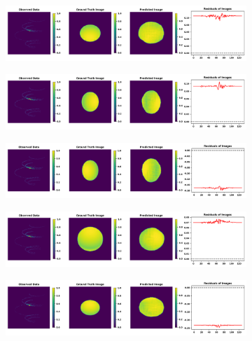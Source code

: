\documentclass[fleqn,usenatbib,twocolumn]{mnras}
\providecommand{\DIFaddend}{} %
\DeclareRobustCommand{\DIFaddend}{\DIFOaddend \let\includegraphics\DIFOincludegraphics} %
\begin{document}
\DIFaddend \begin{figure}
	\centering
	\begin{subfigure}{\linewidth}
		\includegraphics[width=\linewidth]{fig/testing_image/image_0.png}
	\end{subfigure}
	\begin{subfigure}{\linewidth}
		\includegraphics[width=\linewidth]{fig/testing_image/image_16.png}
	\end{subfigure}
	\begin{subfigure}{\linewidth}
		\includegraphics[width=\linewidth]{fig/testing_image/image_35.png}
	\end{subfigure}
	\begin{subfigure}{\linewidth}
		\includegraphics[width=\linewidth]{fig/testing_image/image_38.png}
	\end{subfigure}
	\begin{subfigure}{\linewidth}
		\includegraphics[width=\linewidth]{fig/testing_image/image_42.png}

\end{subfigure}
\end{figure}
\end{document}
